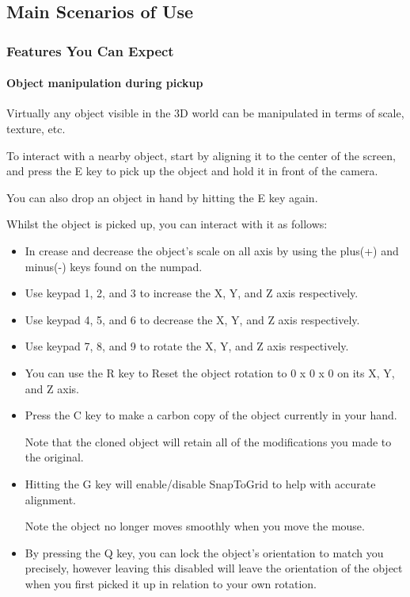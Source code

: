 	
	\subsection{Main Scenarios of Use}
		
		\subsubsection{Features You Can Expect}
		
			\paragraph{Object manipulation during pickup}
			
			Virtually any object visible in the 3D world can be manipulated in terms of scale, texture, etc.
			
			To interact with a nearby object, start by aligning it to the center of the screen, and press the E key to pick up the object and hold it in front of the camera.  
			
			You can also drop an object in hand by hitting the E key again.  
			
			Whilst the object is picked up, you can interact with it as follows:
			
			\begin{itemize}
			
				\item In crease and decrease the object's scale on all axis by using the plus(+) and minus(-) keys found on the numpad.  
				
				\item Use keypad 1, 2, and 3 to increase the X, Y, and Z axis respectively.  
				
				\item Use keypad 4, 5, and 6 to decrease the X, Y, and Z axis respectively.  
				
				\item Use keypad 7, 8, and 9 to rotate the X, Y, and Z axis respectively.  
				
				\item You can use the R key to Reset the object rotation to 0 x 0 x 0 on its X, Y, and Z axis.  
				
				\item Press the C key to make a carbon copy of the object currently in your hand.  
				
				Note that the cloned object will retain all of the modifications you made to the original.  
				
				\item Hitting the G key will enable/disable SnapToGrid to help with accurate alignment.  
				
				Note the object no longer moves smoothly when you move the mouse.
				
				\item By pressing the Q key, you can lock the object's orientation to match you precisely, however leaving this disabled will leave the orientation of the object when you first picked it up in relation to your own rotation.  
				
			\end{itemize}
			
